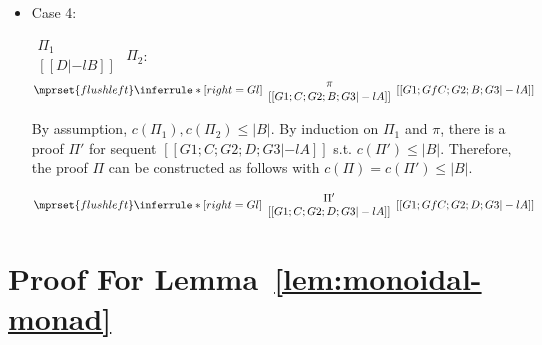 \begin{itemize}
\item Case 4:
      \begin{center}
        \scriptsize
        \begin{math}
          \begin{array}{c}
            \Pi_1 \\
            {[[D |-l B]]}
          \end{array}
        \end{math}
        \qquad\qquad
        $\Pi_2$:
        \begin{math}
          $$\mprset{flushleft}
          \inferrule* [right={\tiny Gl}] {
            {
              \begin{array}{c}
                \pi \\
                {[[G1; C; G2; B; G3 |-l A]]}
              \end{array}
            }
          }{[[G1; Gf C; G2; B; G3 |-l A]]}
        \end{math}
      \end{center}
      By assumption, $c(\Pi_1),c(\Pi_2)\leq |B|$. By induction on $\Pi_1$
      and $\pi$, there is a proof $\Pi'$ for sequent
      $[[G1; C; G2; D; G3 |-l A]]$ s.t. $c(\Pi') \leq |B|$. Therefore, the
      proof $\Pi$ can be constructed as follows with
      $c(\Pi) = c(\Pi') \leq |B|$.
      \begin{center}
        \scriptsize
        \begin{math}
          $$\mprset{flushleft}
          \inferrule* [right={\tiny Gl}] {
            {
              \begin{array}{c}
                \Pi' \\
                {[[G1; C; G2; D; G3 |-l A]]}
              \end{array}
            }
          }{[[G1; Gf C; G2; D; G3 |-l A]]}
        \end{math}
      \end{center}

\end{itemize}



\section{Proof For Lemma~\ref{lem:monoidal-monad}}
\label{app:monoidal-monad}

